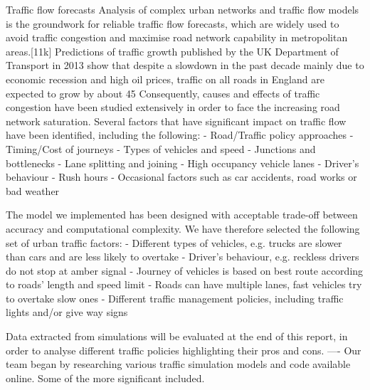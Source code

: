 \documentclass[11pt]{article}
\begin{document}
Traffic flow forecasts 
Analysis of complex urban networks and traffic flow models is the groundwork for reliable traffic flow forecasts, which are widely used to avoid traffic congestion and maximise road network capability in metropolitan areas.[11k]  Predictions of traffic growth published by the UK Department of Transport in 2013 show that despite a slowdown in the  past decade mainly due to economic recession and high oil prices, traffic on all roads in England are expected to grow by about 45%
Consequently, causes and effects of traffic congestion have been studied extensively in order to face the increasing road network saturation. Several factors that have significant impact on traffic flow have been identified, including the following: 
-	Road/Traffic policy approaches
-	Timing/Cost of journeys
-	Types of vehicles and speed
-	Junctions and bottlenecks
-	Lane splitting and joining
-	High occupancy vehicle lanes
-	Driver’s behaviour
-	Rush hours
-	Occasional factors such as car accidents, road works or bad weather

The model we implemented has been designed with acceptable trade-off between accuracy and computational complexity. We have therefore selected the following set of urban traffic factors:
-	Different types of vehicles, e.g. trucks are slower than cars and are less likely to overtake
-	Driver’s behaviour, e.g. reckless drivers do not stop at amber signal
-	Journey of vehicles is based on best route according to roads’ length and speed limit
-	Roads can have multiple lanes, fast vehicles try to overtake slow ones
-	Different traffic management policies, including traffic lights and/or give way signs

Data extracted from simulations will be evaluated at the end of this report, in order to analyse different traffic policies highlighting their pros and cons.
----
Our team began by researching various traffic simulation models and code available online. Some of the more significant included. 
\end{document}
